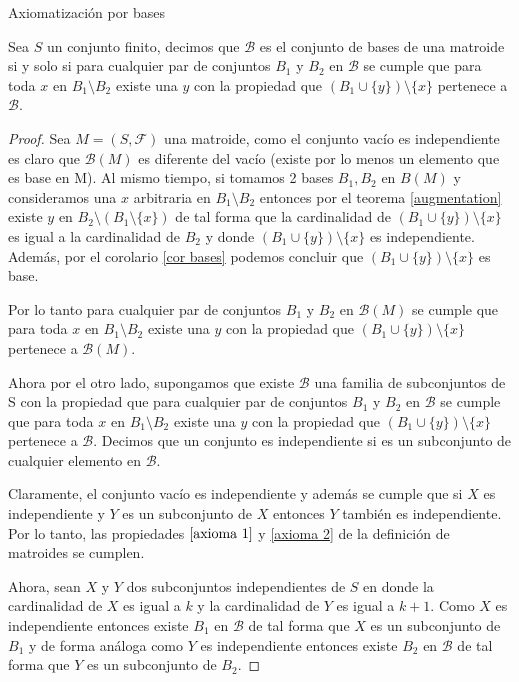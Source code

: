 \begin{teo}{Axiomatización por bases} \label{abases}

Sea $S$ un conjunto finito, decimos que $\mathcal{B}$ es el conjunto de bases de una matroide si y solo si para cualquier par de conjuntos $B_1$ y $B_2$ en $\mathcal{B}$ se cumple que para toda $x$ en $B_1 \setminus B_2$ existe una $y$ con la propiedad que $(B_1 \cup \{y\}) \setminus \{x\}$ pertenece a $\mathcal{B}$. 
\end{teo}
\begin{proof}
Sea $M=(S,\mathcal{F})$ una matroide, como el conjunto vacío es independiente es claro que $\mathcal{B}(M)$ es diferente del vacío (existe por lo menos un elemento que es base en M). Al mismo tiempo, si tomamos 2 bases $B_1, B_2$ en $B(M)$ y consideramos una $x$ arbitraria en $B_1 \setminus B_2$ entonces por el teorema \ref{augmentation} existe $y$ en $B_2 \setminus (B_1 \setminus \{x\})$ de tal forma que la cardinalidad de $(B_1 \cup \{y\}) \setminus \{x\}$ es igual a la cardinalidad de $B_2$ y donde $(B_1 \cup \{y\}) \setminus \{x\}$ es independiente. Además, por el corolario \ref{cor bases} podemos concluir que $(B_1 \cup \{y\}) \setminus \{x\}$ es base. 

Por lo tanto para cualquier par de conjuntos $B_1$ y $B_2$ en $\mathcal{B}(M)$ se cumple que para toda $x$ en $B_1 \setminus B_2$ existe una $y$ con la propiedad que $(B_1 \cup \{y\}) \setminus \{x\}$ pertenece a $\mathcal{B}(M)$.

Ahora por el otro lado, supongamos que existe $\mathcal{B}$ una familia de subconjuntos de S con la propiedad que para cualquier par de conjuntos $B_1$ y $B_2$ en $\mathcal{B}$ se cumple que para toda $x$ en $B_1 \setminus B_2$ existe una $y$ con la propiedad que $(B_1 \cup \{y\}) \setminus \{x\}$ pertenece a $\mathcal{B}$. Decimos que un conjunto es independiente si es un subconjunto de cualquier elemento en $\mathcal{B}$. 

Claramente, el conjunto vacío es independiente y además se cumple que si $X$ es independiente y $Y$ es un subconjunto de $X$ entonces $Y$ también es independiente. Por lo tanto, las propiedades $\ref{axioma 1}$ y \ref{axioma 2} de la definición de matroides se cumplen. 

Ahora, sean $X$ y $Y$ dos subconjuntos independientes de $S$ en donde la cardinalidad de $X$ es igual a $k$ y la cardinalidad de $Y$ es igual a $k+1$. Como $X$ es independiente entonces existe $B_1$ en $\mathcal{B}$ de tal forma que $X$ es un subconjunto de $B_1$ y de forma análoga como $Y$ es independiente entonces existe $B_2$ en $\mathcal{B}$ de tal forma que $Y$ es un subconjunto de $B_2$. 


\end{proof}
